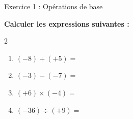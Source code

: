 \documentclass[11pt,a4paper]{article}
\let\correction\rep
\begin{document}
	
	\begin{exercisebox}{ Exercice 1 : Opérations de base }
		
		\vspace{0.2cm}
		\textbf{Calculer les expressions suivantes :}
		
		\begin{multicols}{2}
			\begin{enumerate}[label=\textcolor{primary}{\textbf{\alph*)}},leftmargin=*]
				\item $(-8) + (+5) = $ \correction{-3} 
				\vspace{0.8cm}
				
				\item $(-3) - (-7) = $ \correction{4} 
				\vspace{0.8cm}
				
				\item $(+6) \times (-4) = $ \correction{-24} 
				\vspace{0.8cm}
				
				\item $(-36) \div (+9) = $ \correction{-4} 
			\end{enumerate}
		\end{multicols}
	\end{exercisebox}
	
\end{document}
